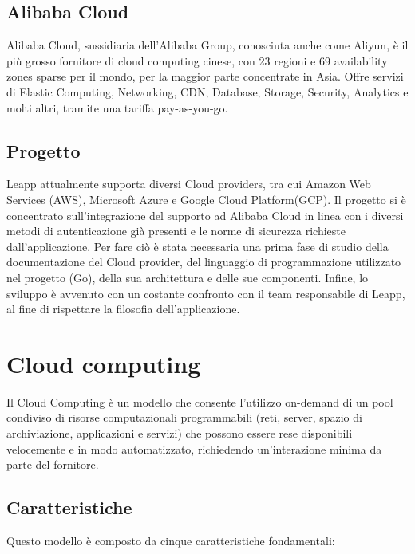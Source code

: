 \documentclass[a4paper]{article}
\begin{document}
\subsection{Alibaba Cloud}
Alibaba Cloud, sussidiaria dell'Alibaba Group, conosciuta anche come Aliyun, è il più grosso fornitore di cloud computing cinese, con 23 regioni e 69 availability zones sparse per il mondo, per la maggior parte concentrate in Asia. Offre servizi di Elastic Computing, Networking, CDN, Database, Storage, Security, Analytics e molti altri, tramite una tariffa pay-as-you-go.

\subsection{Progetto}
Leapp attualmente supporta diversi Cloud providers, tra cui Amazon Web Services (AWS), Microsoft Azure e Google Cloud Platform(GCP). Il progetto si è concentrato sull'integrazione del supporto ad Alibaba Cloud in linea con i diversi metodi di autenticazione già presenti e le norme di sicurezza richieste dall'applicazione. Per fare ciò è stata necessaria una prima fase di studio della documentazione del Cloud provider, del linguaggio di programmazione utilizzato nel progetto (Go), della sua architettura e delle sue componenti. Infine, lo sviluppo è avvenuto con un costante confronto con il team responsabile di Leapp, al fine di rispettare la filosofia dell'applicazione.
\newpage

\section{Cloud computing}
Il Cloud Computing è un modello che consente l'utilizzo on-demand di un pool condiviso di risorse computazionali programmabili (reti, server, spazio di archiviazione, applicazioni e servizi) che possono essere rese disponibili velocemente e in modo automatizzato, richiedendo un'interazione minima da parte del fornitore.\cite{cloud_computing}

\subsection{Caratteristiche}
Questo modello è composto da cinque caratteristiche fondamentali:
\end{document}
